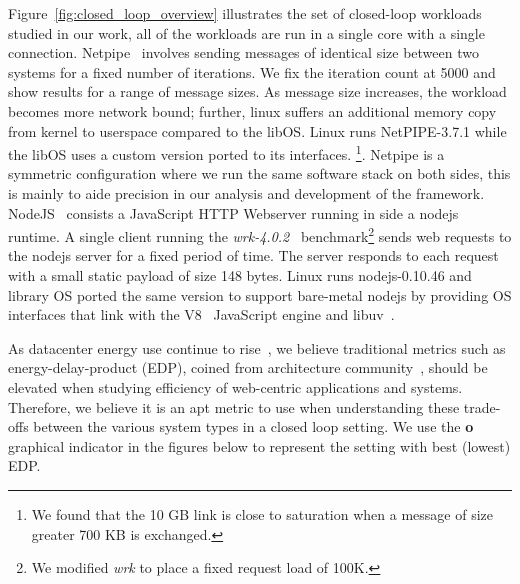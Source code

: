 
Figure~\ref{fig:closed_loop_overview} illustrates the set of closed-loop workloads studied in our work, all of the workloads are run in a single core with a single connection. Netpipe~\cite{snell1996netpipe} involves sending messages of identical size between two systems for a fixed number of iterations. We fix the iteration count at 5000 and show results for a range of message sizes. As message size increases, the workload becomes more network bound; further, linux suffers an additional memory copy from kernel to userspace compared to the libOS. Linux runs NetPIPE-3.7.1 while the libOS uses a custom version ported to its interfaces. \footnote{We found that the 10 GB link is close to saturation when a message of size greater 700 KB is exchanged.}. Netpipe is a symmetric configuration where we run the same software stack on both sides, this is mainly to aide precision in our analysis and development of the framework. NodeJS~\cite{nodejs} consists a JavaScript HTTP Webserver running in side a nodejs runtime. A single client running the \textit{wrk-4.0.2}~\cite{wrk} benchmark\footnote{We modified \textit{wrk} to place a fixed request load of 100K.} sends web requests to the nodejs server for a fixed period of time. The server responds to each request with a small static payload of size 148 bytes. Linux runs nodejs-0.10.46 and library OS ported the same version to support bare-metal nodejs by providing OS interfaces that link with the V8~\cite{v8} JavaScript engine and libuv~\cite{libuv}. 

As datacenter energy use continue to rise~\cite{gupta2020chasing, NLP-energy,warehouse-power,nature1}, we believe traditional metrics such as energy-delay-product (EDP), coined from architecture community~\cite{573184,10.1109/40.888701}, should be elevated when studying efficiency of web-centric applications and systems. Therefore, we believe it is an apt metric to use when understanding these trade-offs between the various system types in a closed loop setting. We use the {\larger[4]\textbf{o}} graphical indicator in the figures below to represent the setting with best (lowest) EDP.

